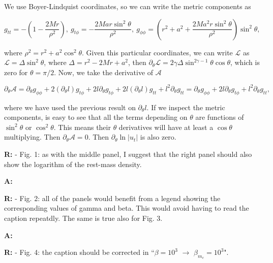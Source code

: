 \documentclass{article}
\begin{document}
We use Boyer-Lindquist coordinates, so we can write the metric components as

\begin{equation}
g_{tt} = - \left(1 - \frac{2Mr}{\rho^2}\right), \ g_{t\phi} = -\frac{2Mar\sin^2\theta}{\rho^2}, \ g_{\phi\phi} = \left(r^2 + a^2 + \frac{2Ma^2r\sin^2\theta}{\rho^2}\right) \sin^2 \theta,
\end{equation}

where $\rho^2 = r^2 + a^2\cos^2 \theta$. Given this particular coordinates, we can write $\mathcal{L}$ as $\mathcal{L} = \Delta \sin^2 \theta$, where $\Delta = r^2 - 2Mr + a^2$, then $\partial_{\theta}\mathcal{L} = 2\gamma \Delta \sin^{2\gamma - 1} \theta \cos \theta$, which is zero for $\theta = \pi/2$. Now, we take the derivative of $\mathcal{A}$

\begin{equation}
\partial_{\theta} \mathcal{A} = \partial_{\theta} g_{\phi\phi} + 2 (\partial_{\theta} l) g_{t\phi} + 2l\partial_{\theta} g_{t\phi} + 2l(\partial_{\theta} l) g_{tt} + l^2 \partial_{\theta} g_{tt} = \partial_{\theta} g_{\phi\phi} + 2l\partial_{\theta} g_{t\phi} + l^2 \partial_{\theta} g_{tt},
\end{equation}

where we have used the previous result on $\partial_{\theta} l$. If we inspect the metric components, is easy to see that all the terms depending on $\theta$ are functions of $\sin^2 \theta$ or $\cos^2 \theta$. This means their $\theta$ derivatives will have at least a $\cos \theta$ multiplying. Then $\partial_{\theta} \mathcal{A} = 0$. Then $\partial_{\theta} \ln|u_t|$ is also zero.

\bigskip

{\bf R:} - Fig. 1: as with the middle panel, I suggest that the right
panel should also show the logarithm of the rest-mass density.

\bigskip

{\bf A:} 

\bigskip

{\bf R:} - Fig. 2: all of the panels would benefit from a legend showing the
corresponding values of gamma and beta. This would avoid having to read the caption repeatdly. The same is true also for Fig. 3.

\bigskip

{\bf A:} 

\bigskip

{\bf R:} - Fig. 4: the caption should be corrected in ``$\beta = 10^3$ $\rightarrow $ $\beta_{m_c}
= 10^3$".
\end{document}
